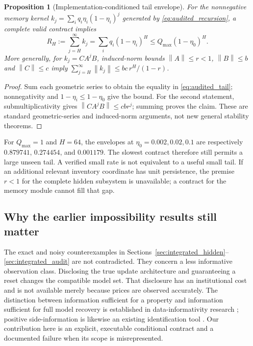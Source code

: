 \documentclass[11pt,a4paper]{article}
\newtheorem{proposition}[theorem]{Proposition}
\theoremstyle{definition}
\theoremstyle{remark}
\newcommand{\norm}[1]{\left\lVert #1\right\rVert}
\begin{document}
\begin{proposition}[Implementation-conditioned tail envelope]
\label{prop:audited_tail}
For the nonnegative memory kernel $k_j=\sum_iq_i\eta_i(1-\eta_i)^j$ generated by \cref{eq:audited_recursion}, a complete valid contract implies
\begin{equation}
 R_H:=\sum_{j=H}^{\infty}k_j
 =\sum_iq_i(1-\eta_i)^H
 \le Q_{\max}(1-\eta_0)^H.
 \label{eq:audited_tail}
\end{equation}
More generally, for $k_j=CA^jB$, induced-norm bounds $\norm{A}\le r<1$, $\norm{B}\le b$ and $\norm{C}\le c$ imply
$\sum_{j=H}^{\infty}\norm{k_j}\le bc\,r^H/(1-r)$.
\end{proposition}
\begin{proof}
Sum each geometric series to obtain the equality in \cref{eq:audited_tail}; nonnegativity and $1-\eta_i\le1-\eta_0$ give the bound. For the second statement, submultiplicativity gives $\norm{CA^jB}\le cb r^j$; summing proves the claim. These are standard geometric-series and induced-norm arguments, not new general stability theorems.
\end{proof}

For $Q_{\max}=1$ and $H=64$, the envelopes at $\eta_0=0.002,0.02,0.1$ are respectively $0.879741$, $0.274454$, and $0.001179$. The slowest contract therefore still permits a large unseen tail. A verified small rate is not equivalent to a useful small tail. If an additional relevant inventory coordinate has unit persistence, the premise $r<1$ for the complete hidden subsystem is unavailable; a contract for the memory module cannot fill that gap.

\subsection{Why the earlier impossibility results still matter}
The exact and noisy counterexamples in Sections~\ref{sec:integrated_hidden}--\ref{sec:integrated_audit} are not contradicted. They concern a less informative observation class. Disclosing the true update architecture and guaranteeing a reset changes the compatible model set. That disclosure has an institutional cost and is not available merely because prices are observed accurately. The distinction between information sufficient for a property and information sufficient for full model recovery is established in data-informativity research \citep{vanwaarde2020}; positive side-information is likewise an existing identification tool \citep{khosravi2025}. Our contribution here is an explicit, executable conditional contract and a documented failure when its scope is misrepresented.
\end{document}
